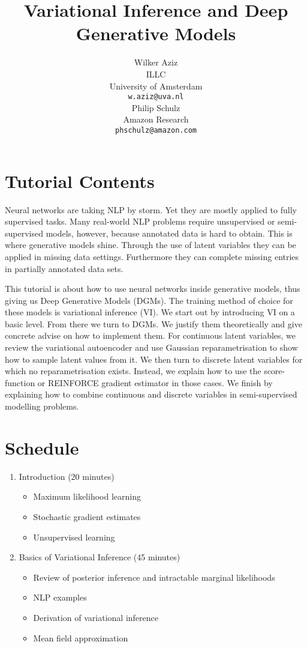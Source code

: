\documentclass[11pt,a4paper]{article}
\title{Variational Inference and Deep Generative Models}
\author{Wilker Aziz \\
  ILLC \\
  University of Amsterdam \\
  {\tt w.aziz@uva.nl} \\\And
  Philip Schulz \\
  Amazon Research \\
  {\tt phschulz@amazon.com} \\}
\date{}
\begin{document}
\maketitle

\section{Tutorial Contents}

Neural networks are taking NLP by storm. Yet they are mostly applied to fully supervised tasks. Many real-world NLP problems require unsupervised or semi-supervised models, however, because annotated data is hard to obtain. This is where generative models shine. Through the use of latent variables they can be applied in missing data settings. Furthermore they can complete missing entries in partially annotated data sets.

This tutorial is about how to use neural networks inside generative models, thus giving us Deep Generative Models (DGMs). The training method of choice for these models is variational inference (VI). We start out by introducing VI on a basic level. From there we turn to DGMs. We justify them theoretically and give concrete advise on how to implement them. For continuous latent variables, we review the variational autoencoder and use Gaussian reparametrisation to show how to sample latent values from it. We then turn to discrete latent variables for which no reparametrisation exists. Instead, we explain how to use the score-function or REINFORCE gradient estimator in those cases. We finish by explaining how to combine continuous and discrete variables in semi-supervised modelling problems.

\section{Schedule}

\begin{enumerate}
\item Introduction (20 minutes)
\begin{itemize}
\item Maximum likelihood learning
\item Stochastic gradient estimates
\item Unsupervised learning
\end{itemize}
\item Basics of Variational Inference (45 minutes)
\begin{itemize}
\item Review of posterior inference and intractable marginal likelihoods
\item NLP examples
\item Derivation of  variational inference
\item Mean field approximation
\end{itemize}
\end{enumerate}
\end{document}
